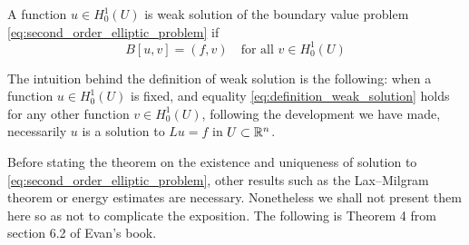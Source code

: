 \begin{definition} \label{def:weak_solution}
	A function $u \in H^1_0(U)$ is weak solution of the boundary value problem
	\eqref{eq:second_order_elliptic_problem} if
	\begin{equation} \label{eq:definition_weak_solution}
		B[u,v] = (f,v) \quad \text{for all } v \in H^1_0(U)
	\end{equation}
\end{definition}

\noindent
The intuition behind the definition of weak solution is the following: when a
function $u \in H^1_0(U)$ is fixed, and equality
\eqref{eq:definition_weak_solution} holds for any other function $v \in
H^1_0(U)$, following the development we have made, necessarily $u$ is a solution
to $L u = f$ in $U \subset \mathbb{R}^n$. 

Before stating the theorem on the existence and uniqueness of solution to
\eqref{eq:second_order_elliptic_problem}, other results such as the Lax--Milgram
theorem or energy estimates are necessary. Nonetheless we shall not present them
here so as not to complicate the exposition. The following is Theorem 4 from
section 6.2 of Evan's book.


